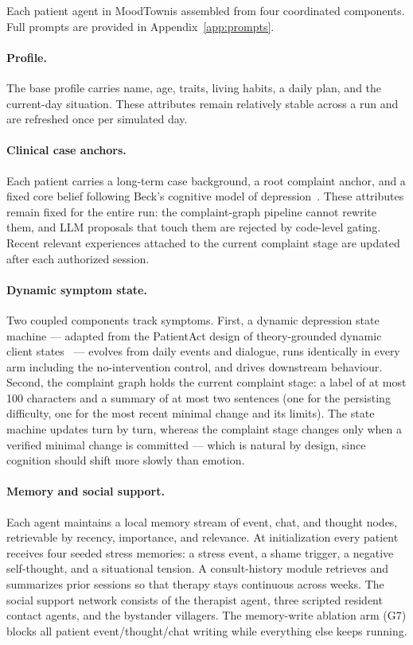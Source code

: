 \documentclass[10pt]{article}
\newcommand{\sys}{MoodTown}
\begin{document}
Each patient agent in \sys is assembled from four coordinated components.
Full prompts are provided in Appendix~\ref{app:prompts}.

\paragraph{Profile.}
The base profile carries name, age, traits, living habits, a daily plan, and the current-day situation.
These attributes remain relatively stable across a run and are refreshed once per simulated day.

\paragraph{Clinical case anchors.}
Each patient carries a long-term case background, a root complaint anchor, and a fixed core belief following Beck's cognitive model of depression~\citep{beck1967,beck1979}.
These attributes remain fixed for the entire run: the complaint-graph pipeline cannot rewrite them, and LLM proposals that touch them are rejected by code-level gating.
Recent relevant experiences attached to the current complaint stage are updated after each authorized session.

\paragraph{Dynamic symptom state.}
Two coupled components track symptoms.
First, a dynamic depression state machine --- adapted from the PatientAct design of theory-grounded dynamic client states~\citep{patientact2026} --- evolves from daily events and dialogue, runs identically in every arm including the no-intervention control, and drives downstream behaviour.
Second, the complaint graph holds the current complaint stage: a label of at most 100 characters and a summary of at most two sentences (one for the persisting difficulty, one for the most recent minimal change and its limits).
The state machine updates turn by turn, whereas the complaint stage changes only when a verified minimal change is committed --- which is natural by design, since cognition should shift more slowly than emotion.

\paragraph{Memory and social support.}
Each agent maintains a local memory stream of event, chat, and thought nodes, retrievable by recency, importance, and relevance.
At initialization every patient receives four seeded stress memories: a stress event, a shame trigger, a negative self-thought, and a situational tension.
A consult-history module retrieves and summarizes prior sessions so that therapy stays continuous across weeks.
The social support network consists of the therapist agent, three scripted resident contact agents, and the bystander villagers.
The memory-write ablation arm (G7) blocks all patient event/thought/chat writing while everything else keeps running.
\end{document}
